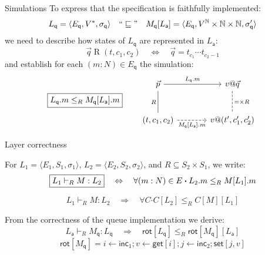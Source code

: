 \documentclass[aspectratio=141]{beamer}
\newcommand{\kw}[1]{\ensuremath{ \mathsf{#1} }}
\newcommand{\bdot}{\boldsymbol{\cdot}}
\begin{document}
\begin{frame}[fragile]{Simulations} %
To express that the specification is faithfully implemented:
\[
  L_\kw{q} = \langle
    E_\kw{q},
    V^*,
    \sigma_\kw{q}
  \rangle
  \quad ``\sqsubseteq" \quad
  M_\kw{q}[L_\kw{a}] = \langle
    E_\kw{q},
    V^\mathbb{N} \times \mathbb{N} \times \mathbb{N},
    \sigma'_\kw{q}
  \rangle
\]
we need to describe
how states of $L_\kw{q}$ are represented in $L_\kw{a}$:
\[
  \vec{q} \mathrel{R} (t, c_1, c_2)
  \quad \Leftrightarrow \quad
  \vec{q} = t_{c_1} \cdots t_{c_2-1}
\]
and establish for each $(m:N) \in E_\kw{q}$ the simulation:
\[
  \fbox{$L_\kw{q}.m \le_R M_\kw{q}[L_\kw{a}].m$}
  \qquad
  \begin{tikzcd}[sep=large]
    \vec{p} \ar[r, "L_\kw{q}.m"] \ar[d, "R"', dash] &
    v@\vec{q} \ar[d, "{=} \times R", dash, dashed] \\
    (t, c_1, c_2) \ar[r, "{M_\kw{q}[L_\kw{a}].m}"', dashed] &
    v@(t', c_1', c_2')
  \end{tikzcd}
\]
\end{frame}

\begin{frame}{Layer correctness} %
  \begin{definition}
    For $L_1 = \langle E_1, S_1, \sigma_1 \rangle$,
    $L_2 = \langle E_2, S_2, \sigma_2 \rangle$, and
    $R \subseteq S_2 \times S_1$,
    we write:
    \[
      \fbox{$L_1 \vdash_R M : L_2$} \quad \Leftrightarrow \quad
      \forall (m:N) \in E \bdot L_2.m \le_R M[L_1].m
    \]
  \end{definition}
  \begin{theorem}[Soundness]
    \vspace{-0.5\baselineskip}
    \[
      L_1 \vdash_R M : L_2 \quad \Rightarrow \quad
      \forall C \bdot C[L_2] \le_R C[M][L_1]
    \]
  \end{theorem}
  \pause
  \begin{example}
    From the correctness of the queue implementation we derive:
    \[
      L_\kw{a} \vdash_R M_\kw{q} : L_\kw{q}
      \quad \Rightarrow \quad
      \kw{rot}[L_\kw{q}] \le_R \kw{rot}[M_\kw{q}][L_\kw{a}]
    \]
    \[
      \kw{rot}[M_\kw{q}] =
        i \mathop{\leftarrow} \kw{inc}_1 \mathop{;}
        v \mathop{\leftarrow} \kw{get}[i] \mathop{;}
        j \mathop{\leftarrow} \kw{inc}_2 \mathop{;}
        \kw{set}[j, v]
    \]
  \end{example}
\end{frame}
\end{document}
